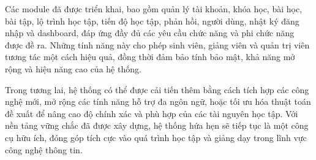 Các module đã được triển khai, bao gồm quản lý tài khoản, khóa học, bài học, bài tập, lộ trình học tập, tiến độ học tập, phản hồi, người dùng, nhật ký đăng nhập và dashboard, đáp ứng đầy đủ các yêu cầu chức năng và phi chức năng được đề ra. Những tính năng này cho phép sinh viên, giảng viên và quản trị viên tương tác một cách hiệu quả, đồng thời đảm bảo tính bảo mật, khả năng mở rộng và hiệu năng cao của hệ thống.

Trong tương lai, hệ thống có thể được cải tiến thêm bằng cách tích hợp các công nghệ mới, mở rộng các tính năng hỗ trợ đa ngôn ngữ, hoặc tối ưu hóa thuật toán đề xuất để nâng cao độ chính xác và phù hợp của các tài nguyên học tập. Với nền tảng vững chắc đã được xây dựng, hệ thống hứa hẹn sẽ tiếp tục là một công cụ hữu ích, đóng góp tích cực vào quá trình học tập và giảng dạy trong lĩnh vực công nghệ thông tin.
